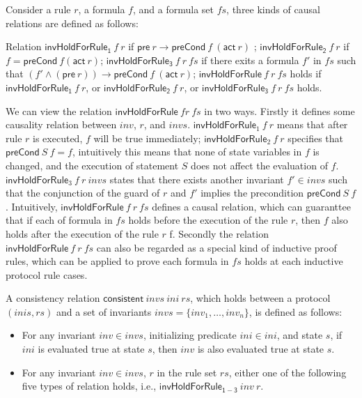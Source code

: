 \documentclass{llncs}
\begin{document}
 Consider a rule $r$, a formula $f$, and a formula set $fs$, three
 kinds of causal relations are defined as follows:

\begin{definition}  Relation
$\mathsf{invHoldForRule_1} ~f ~r$ if    $ \mathsf{pre}~ r
\longrightarrow \mathsf{preCond}~ f ~(\mathsf{act}~ r)$ ;
$\mathsf{invHoldForRule_2}~ f~ r$ if $f = \mathsf{preCond}~ f
(\mathsf{act}~ r)$; $\mathsf{invHoldForRule_3}~ f~ r ~fs$ if there
exits a formula $f'$ in $fs$ such that
  $(f' \wedge (\mathsf{pre}~ r)) \longrightarrow \mathsf{preCond} ~f ~(\mathsf{act}
  ~r)$; $\mathsf{invHoldForRule}~ f~ r ~fs$ holds if $\mathsf{invHoldForRule_1} ~f
  ~r$, or $\mathsf{invHoldForRule_2} ~f ~r$, or $\mathsf{invHoldForRule_3}~ f~ r
  ~fs$ holds.
\end{definition}

 We can view the relation $\mathsf{invHoldForRule}~ f
r ~fs$ in two ways. Firstly it defines some causality relation
between $inv$, $r$, and $invs$.  $\mathsf{invHoldForRule}_1~f~ r$
  means that after rule $r$ is executed,
 $f$ will be true immediately;   $\mathsf{invHoldForRule}_2~f~ r$ specifies that
 $\mathsf{preCond}~S~f=f$, intuitively this means that none of state variables in $f$ is
 changed, and the execution of statement $S$ does not affect the
 evaluation of $f$.
 $\mathsf{invHoldForRule}_3~f~ r~invs$ states
  that  there exists another invariant $f' \in invs$ such that
  the conjunction of the guard of $r$ and $f'$ implies the precondition  $\mathsf{preCond}~S~f$.
Intuitively, $\mathsf{invHoldForRule} ~f ~r ~fs$ defines a causal
relation, which can guaranttee that if each of formula in $fs$ holds
before the execution of the rule $r$, then  $f$ also holds after the
execution of the rule $r$ f. Secondly the relation
$\mathsf{invHoldForRule} ~f ~r ~fs$ can also be regarded as a
special kind of inductive proof rules, which can be applied to prove
each formula in $fs$ holds at each inductive protocol rule cases.


\begin{definition}
A consistency relation $\mathsf{consistent}~ invs ~ini~ rs$,
 which holds between a protocol $(inis,rs)$ and
a set of invariants $invs=\{inv_1,\ldots, inv_n\}$,  is defined as
follows:
%
\begin{itemize}
\item For any invariant $inv \in invs$,
initializing predicate $ini \in ini$, and state $s$, if $ini$ is
evaluated true at state $s$, then $inv$ is also evaluated true at
state $s$.

\item For any invariant $inv \in invs$, $r$ in the rule set
$rs$, either one of the following five types of relation holds,
i.e., $\mathsf{invHoldForRule_{1-3}}~inv~ r$.

\end{itemize}
\end{definition}
\end{document}
